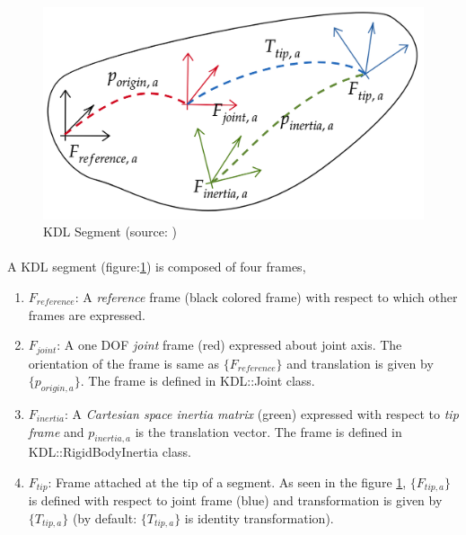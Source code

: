 \begin{figure}[h!]
	\begin{center}
		\includegraphics[scale=0.25]{images/segment}
	\end{center}
	\caption{KDL Segment (source: \cite{kinematictreeKDL})}
	\label{fig:segment}
\end{figure} 

\paragraph{}A KDL segment (figure:\ref{fig:segment}) is composed of four frames,
\begin{enumerate}
	\item $F_{reference}$: A \textit{reference} frame (black colored frame) with respect to which other frames are expressed.
	\item $F_{joint}$: A one DOF \textit{joint} frame (red) expressed about joint axis. The orientation of the frame is same as $\{F_{reference}\}$ and translation is given by $\{p_{origin, a}\}$. The frame is defined in KDL::Joint class.
	\item $F_{inertia}$: A \textit{Cartesian space inertia matrix} (green) expressed with respect to \textit{tip frame} and $p_{inertia, a}$ is the translation vector. The frame is defined in KDL::RigidBodyInertia class.  
	\item $F_{tip}$: Frame attached at the tip of a segment. As seen in the figure \ref{fig:segment}, $\{F_{tip, a}\}$ is defined with respect to joint frame (blue) and transformation is given by $\{T_{tip, a}\}$ (by default: $\{T_{tip, a}\}$ is identity transformation). 
\end{enumerate}

